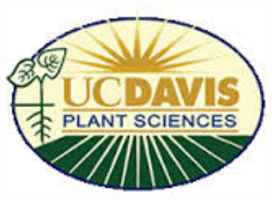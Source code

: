 \documentclass[a0,portrait]{a0poster}
\begin{document}
%
\begin{minipage}[b]{0.15\textwidth}
\includegraphics[width=10cm]{pslogo.jpg}\\
\end{minipage}
%


\vspace{1cm} %

\end{document}
